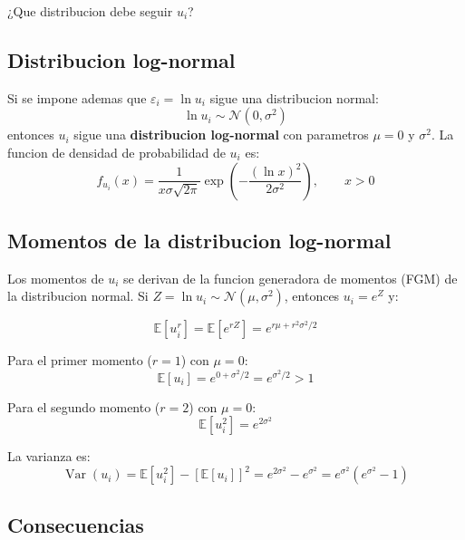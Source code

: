 \documentclass[12pt, letterpaper]{article}
\theoremstyle{remark}
\newcommand{\E}{\mathbb{E}}
\newcommand{\Var}{\operatorname{Var}}
\begin{document}
¿Que distribucion debe seguir $u_i$?

\subsection{Distribucion log-normal}

Si se impone ademas que $\varepsilon_i = \ln u_i$ sigue una distribucion normal:
\begin{equation}
  \ln u_i \sim \mathcal{N}(0, \sigma^2)
  \label{eq:lognormal_cond}
\end{equation}
entonces $u_i$ sigue una \textbf{distribucion log-normal} con parametros
$\mu = 0$ y $\sigma^2$. La funcion de densidad de probabilidad de $u_i$ es:
\begin{equation}
  f_{u_i}(x) = \frac{1}{x\sigma\sqrt{2\pi}} \exp\!\left(-\frac{(\ln x)^2}{2\sigma^2}\right),
  \qquad x > 0
  \label{eq:fdp_lognormal}
\end{equation}

\subsection{Momentos de la distribucion log-normal}

Los momentos de $u_i$ se derivan de la funcion generadora de momentos (FGM)
de la distribucion normal. Si $Z = \ln u_i \sim \mathcal{N}(\mu, \sigma^2)$, entonces
$u_i = e^Z$ y:

\begin{equation}
  \E[u_i^r] = \E[e^{rZ}] = e^{r\mu + r^2\sigma^2/2}
  \label{eq:momentos_lognormal}
\end{equation}

Para el primer momento ($r = 1$) con $\mu = 0$:
\begin{equation}
  \E[u_i] = e^{0 + \sigma^2/2} = e^{\sigma^2/2} > 1
  \label{eq:media_u}
\end{equation}

Para el segundo momento ($r = 2$) con $\mu = 0$:
\begin{equation}
  \E[u_i^2] = e^{2\sigma^2}
  \label{eq:mom2_u}
\end{equation}

La varianza es:
\begin{equation}
  \Var(u_i) = \E[u_i^2] - [\E[u_i]]^2
            = e^{2\sigma^2} - e^{\sigma^2}
            = e^{\sigma^2}(e^{\sigma^2} - 1)
  \label{eq:var_u}
\end{equation}

\subsection{Consecuencias}
\end{document}
